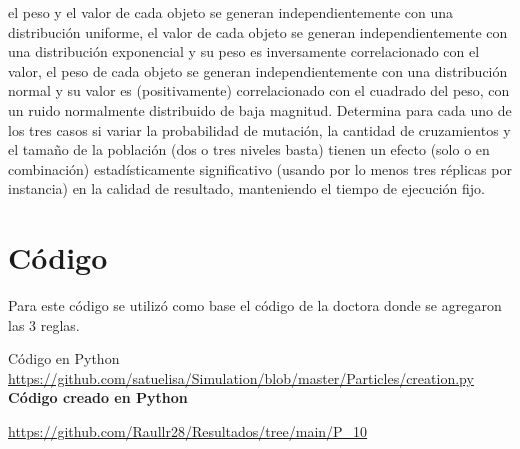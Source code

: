 \documentclass{article}
\begin{document}
el peso y el valor de cada objeto se generan independientemente con una distribución uniforme,
el valor de cada objeto se generan independientemente con una distribución exponencial y su peso es inversamente correlacionado con el valor,
el peso de cada objeto se generan independientemente con una distribución normal y su valor es (positivamente) correlacionado con el cuadrado del peso, con un ruido normalmente distribuido de baja magnitud.
Determina para cada uno de los tres casos si variar la probabilidad de mutación, la cantidad de cruzamientos y el tamaño de la población (dos o tres niveles basta) tienen un efecto (solo o en combinación) estadísticamente significativo (usando por lo menos tres réplicas por instancia) en la calidad de resultado, manteniendo el tiempo de ejecución fijo\citep{2}.


\section{C\'{o}digo}
Para este código se utilizó como base el código de la doctora donde se agregaron las 3 reglas.


 Código en Python 
\url{https://github.com/satuelisa/Simulation/blob/master/Particles/creation.py}
\newpage
{\bf Código creado en Python}

\url{https://github.com/Raullr28/Resultados/tree/main/P_10}

\renewcommand{\listingscaption}{Código}
\end{document}
